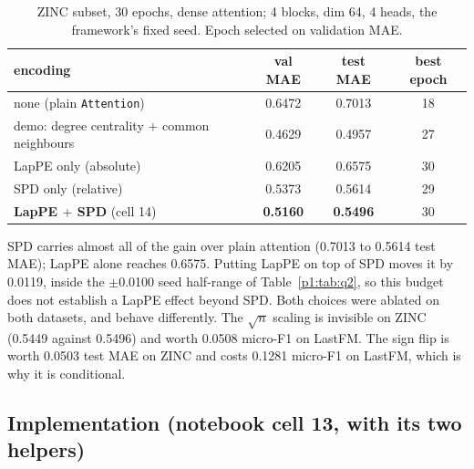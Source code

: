 \begin{table}[H]
\centering
\caption{ZINC subset, 30 epochs, dense attention; 4 blocks, dim 64, 4 heads, the framework's fixed seed. Epoch selected on validation MAE.}
\label{p1:tab:q1}
\begin{tabular}{lccc}
\toprule
encoding & val MAE & test MAE & best epoch \\
\midrule
none (plain \texttt{Attention}) & 0.6472 & 0.7013 & 18 \\
demo: degree centrality $+$ common neighbours & 0.4629 & 0.4957 & 27 \\
LapPE only (absolute) & 0.6205 & 0.6575 & 30 \\
SPD only (relative) & 0.5373 & 0.5614 & 29 \\
\textbf{LapPE $+$ SPD} (cell 14) & \textbf{0.5160} & \textbf{0.5496} & 30 \\
\bottomrule
\end{tabular}
\end{table}

SPD carries almost all of the gain over plain attention (0.7013 to 0.5614 test MAE); LapPE alone reaches 0.6575. Putting LapPE on top of SPD moves it by 0.0119, inside the $\pm$0.0100 seed half-range of Table~\ref{p1:tab:q2}, so this budget does not establish a LapPE effect beyond SPD. Both choices were ablated on both datasets, and behave differently. The $\sqrt{n}$ scaling is invisible on ZINC (0.5449 against 0.5496) and worth 0.0508 micro-F1 on LastFM. The sign flip is worth 0.0503 test MAE on ZINC and costs 0.1281 micro-F1 on LastFM, which is why it is conditional.

\subsection*{Implementation (notebook cell 13, with its two helpers)}

